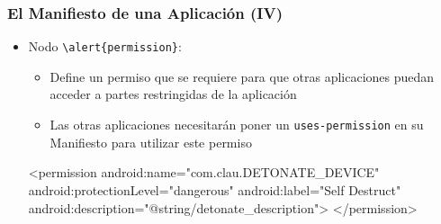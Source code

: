 \documentclass[hyperref={pdfpagelabels=true},ucs]{beamer}
\begin{document}
\begin{frame}[fragile]
\frametitle{El Manifiesto de una Aplicación (IV)}  

\begin{itemize}

\item Nodo \Verb|\alert{permission}|:
  \begin{itemize}
  \item Define un permiso que se requiere para que otras aplicaciones
    puedan acceder a partes restringidas de la aplicación
  \item Las otras aplicaciones necesitarán poner un
    \verb|uses-permission| en su Manifiesto para utilizar este permiso
  \end{itemize}

\begin{tiny}
\begin{block}{}
\begin{xml}
<permission android:name="com.clau.DETONATE_DEVICE"
            android:protectionLevel="dangerous"
            android:label="Self Destruct"
            android:description="@string/detonate_description">
</permission>
\end{xml}
\end{block}
\end{tiny}


\end{itemize}

\end{frame}
\end{document}

